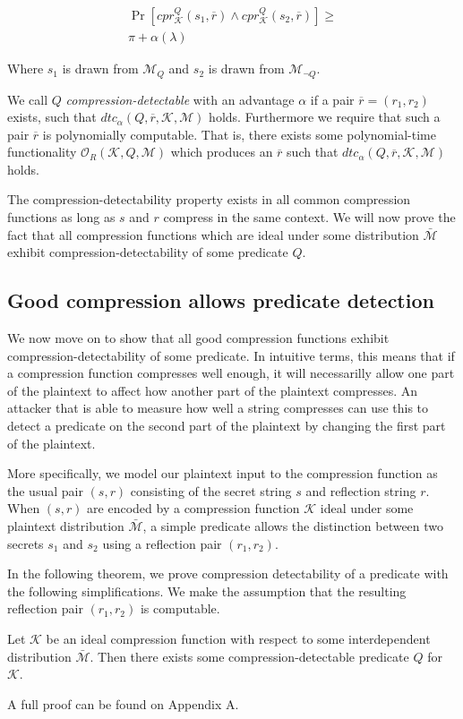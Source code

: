 \begin{align*}
    \Pr
        [cpr^Q_{\mathcal{K}}(s_1, \overbar{r}) \land
         cpr^Q_{\mathcal{K}}(s_2, \overbar{r})]
    \geq\\
    \pi + \alpha(\lambda)
\end{align*}

Where $s_1$ is drawn from $\mathcal{M}_Q$ and $s_2$ is drawn from
$\mathcal{M}_{\lnot Q}$.

We call $Q$ \textit{compression-detectable} with an advantage $\alpha$ if a pair
$\overbar{r} = (r_1, r_2)$ exists, such that $dtc_\alpha(Q, \overbar{r}, \mathcal{K},
\mathcal{M})$ holds. Furthermore we require that such a pair $\overbar{r}$ is
polynomially computable. That is, there exists some polynomial-time
functionality $\mathcal{O}_R(\mathcal{K}, Q, \mathcal{M})$ which produces an
$\overbar{r}$ such that $dtc_\alpha(Q, \overbar{r}, \mathcal{K}, \mathcal{M})$ holds.

The compression-detectability property exists in all common compression
functions as long as $s$ and $r$ compress in the same context. We will now
prove the fact that all compression functions which are ideal under some
distribution $\bar{\mathcal{M}}$ exhibit compression-detectability of some
predicate $Q$.

\subsection{Good compression allows predicate detection}

We now move on to show that all good compression functions exhibit
compression-detectability of some predicate. In intuitive terms, this means
that if a compression function compresses well enough, it will necessarilly
allow one part of the plaintext to affect how another part of the plaintext
compresses. An attacker that is able to measure how well a string compresses
can use this to detect a predicate on the second part of the plaintext by
changing the first part of the plaintext.

More specifically, we model our plaintext input to the compression function as
the usual pair $(s, r)$ consisting of the secret string $s$ and reflection
string $r$. When $(s, r)$ are encoded by a compression function $\mathcal{K}$ ideal
under some plaintext distribution $\bar{\mathcal{M}}$, a simple predicate
allows the distinction between two secrets $s_1$ and $s_2$ using a reflection
pair $(r_1, r_2)$.

In the following theorem, we prove compression detectability of a predicate
with the following simplifications. We make the assumption that the
resulting reflection pair $(r_1, r_2)$ is computable.

\begin{lemma}
Let $\mathcal{K}$ be an ideal compression function with respect to some
interdependent distribution $\bar{\mathcal{M}}$. Then there exists
some compression-detectable predicate $Q$ for $\mathcal{K}$.
\end{lemma}

A full proof can be found on Appendix A.
